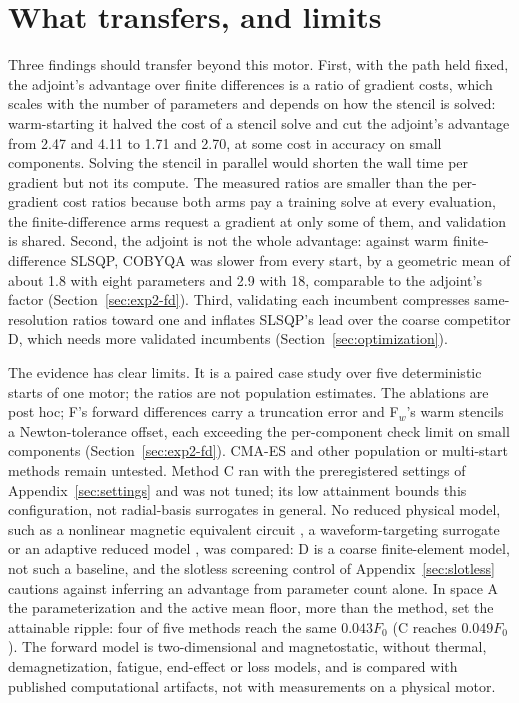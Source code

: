 \documentclass{anvil-paper}
\begin{document}
\section{What transfers, and limits}\label{sec:discussion}
Three findings should transfer beyond this motor. First, with the path
held fixed, the adjoint's advantage over finite differences is a ratio of
gradient costs, which scales with the number of parameters and depends on
how the stencil is solved: warm-starting it halved the cost of a stencil
solve and cut the adjoint's advantage from 2.47 and 4.11 to 1.71 and 2.70,
at some cost in accuracy on small components. Solving the stencil in
parallel would shorten the wall time per gradient but not its compute. The
measured ratios are smaller than the per-gradient cost ratios because both
arms pay a training solve at every evaluation, the finite-difference arms
request a gradient at only some of them, and validation is shared. Second,
the adjoint is not the whole advantage: against warm finite-difference
SLSQP, COBYQA was slower from every start, by a geometric mean of about 1.8
with eight parameters and 2.9 with 18, comparable to the adjoint's factor
(Section~\ref{sec:exp2-fd}). Third, validating
each incumbent compresses same-resolution ratios toward one and inflates
SLSQP's lead over the coarse competitor D, which needs more validated
incumbents (Section~\ref{sec:optimization}).

The evidence has clear limits. It is a paired case study over five
deterministic starts of one motor; the ratios are not population estimates.
The ablations are post hoc; F's forward differences carry a truncation
error and F$_w$'s warm stencils a Newton-tolerance offset, each exceeding the
per-component check limit on small components (Section~\ref{sec:exp2-fd}). CMA-ES and other population or
multi-start methods remain untested.
Method C ran with the preregistered settings of
Appendix~\ref{sec:settings} and was not tuned; its low attainment bounds
this configuration, not radial-basis surrogates in general. No reduced
physical model, such as a nonlinear magnetic equivalent circuit
\citep{kemmetmueller2015}, a waveform-targeting surrogate \citep{roomi2022}
or an adaptive reduced model \citep{wen2023}, was compared: D is a coarse finite-element model, not such a baseline, and
the slotless screening control of Appendix~\ref{sec:slotless} cautions
against inferring an advantage from parameter count alone. In space A
the parameterization and the active mean floor, more than the method, set
the attainable ripple: four of five methods reach the same $0.043F_0$ (C
reaches $0.049F_0$). The forward model is two-dimensional and
magnetostatic, without thermal, demagnetization, fatigue, end-effect or
loss models, and is compared with published computational artifacts, not
with measurements on a physical motor.
\end{document}
